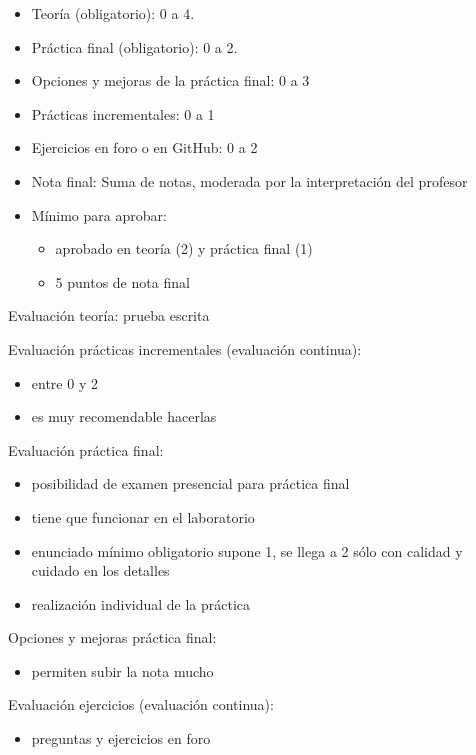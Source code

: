 \documentclass[a4paper,12pt]{article}
\begin{document}
\begin{itemize}
\item Teoría (obligatorio): 0 a 4.
\item Práctica final (obligatorio): 0 a 2.
\item Opciones y mejoras de la práctica final: 0 a 3
\item Prácticas incrementales: 0 a 1
\item Ejercicios en foro o en GitHub: 0 a 2
\item Nota final: Suma de notas, moderada por la interpretación del profesor
\item Mínimo para aprobar:
      \begin{itemize}
      \item aprobado en teoría (2) y práctica final (1)
      \item 5 puntos de nota final
      \end{itemize}
\end{itemize}

Evaluación teoría: prueba escrita

Evaluación prácticas incrementales (evaluación continua):

\begin{itemize}
\item entre 0 y 2 
\item es muy recomendable hacerlas
\end{itemize}

Evaluación práctica final:

\begin{itemize}
\item posibilidad de examen presencial para práctica final
\item tiene que funcionar en el laboratorio
\item enunciado mínimo obligatorio supone 1, se llega a 2 sólo con calidad y cuidado en los detalles
\item realización individual de la práctica
\end{itemize}

Opciones y mejoras práctica final:

\begin{itemize}
\item permiten subir la nota mucho
\end{itemize}

Evaluación ejercicios (evaluación continua):

\begin{itemize}
\item preguntas y ejercicios en foro
\end{itemize}
\end{document}
